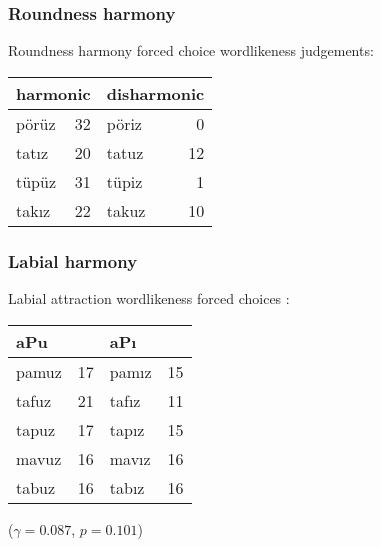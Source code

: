 \subsubsection{Roundness harmony}

\begin{example}
Roundness harmony forced choice wordlikeness judgements: 

\vspace{0.5\baselineskip}
\begin{tabular}{l r l r}
\toprule
\multicolumn{2}{l}{harmonic} & \multicolumn{2}{l}{disharmonic} \\
\midrule
pörüz & 32 & pöriz & 0  \\
tatız & 20 & tatuz & 12 \\
tüpüz & 31 & tüpiz & 1  \\
takız & 22 & takuz & 10 \\
\bottomrule
\end{tabular}
\end{example}


\subsubsection{Labial harmony}

\begin{example}
Labial attraction wordlikeness forced choices \citep[314]{Zimmer1969}: 

\vspace{0.5\baselineskip}
\begin{tabular}{l r l r}
\toprule
\multicolumn{2}{l}{aPu} & \multicolumn{2}{l}{aPı} \\
\midrule
pamuz & 17              & pamız & 15 \\
tafuz & 21              & tafız & 11 \\
tapuz & 17              & tapız & 15 \\
mavuz & 16              & mavız & 16 \\
tabuz & 16              & tabız & 16 \\
\bottomrule
\end{tabular}
\end{example}

($\gamma = 0.087$, $p = 0.101$)
